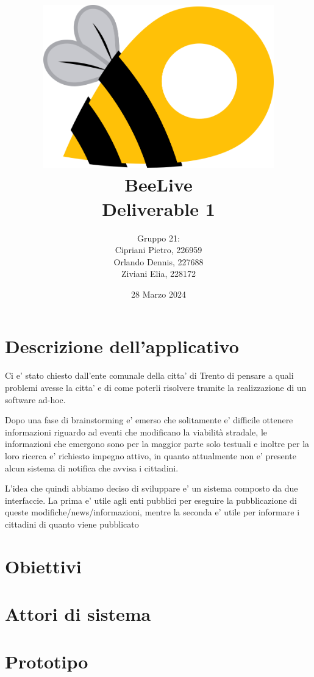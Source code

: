 \documentclass{article}
\title{\includegraphics[width=0.75\textwidth]{Images/BeeLive-Logo.png}\\\vspace{100pt}
\LARGE{\textbf{BeeLive\\Deliverable 1}}}
\author{Gruppo 21:\\
Cipriani Pietro, 226959\\
Orlando Dennis, 227688\\
Ziviani Elia, 228172}
\date{28 Marzo 2024}
\begin{document}
\maketitle
\thispagestyle{firstpage} %
\clearpage

\pagestyle{nonplain} %

\renewcommand{\contentsname}{Indice}
\tableofcontents

\clearpage
\section{Descrizione dell'applicativo}
Ci e' stato chiesto dall'ente comunale della citta' di Trento di pensare a quali problemi avesse la citta' e di come poterli risolvere tramite la realizzazione di un software ad-hoc.

Dopo una fase di brainstorming e' emerso che solitamente e' difficile ottenere informazioni riguardo ad eventi che modificano la viabilità stradale, le informazioni che emergono sono per la maggior parte solo testuali e inoltre per la loro ricerca e' richiesto impegno attivo, in quanto attualmente non e' presente alcun sistema di notifica che avvisa i cittadini.

L'idea che quindi abbiamo deciso di sviluppare e' un sistema composto da due interfaccie.
La prima e' utile agli enti pubblici per eseguire la pubblicazione di queste modifiche/news/informazioni, mentre la seconda e' utile per informare i cittadini di quanto viene pubblicato

\clearpage

\section{Obiettivi}
\clearpage

\section{Attori di sistema}
\clearpage

\section{Prototipo}
\clearpage
\end{document}
